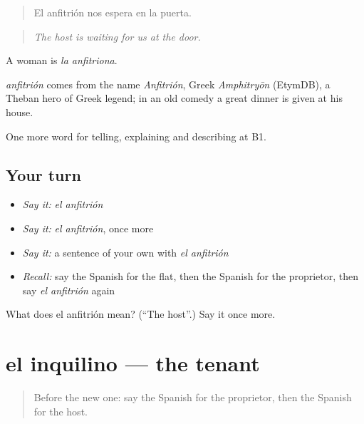 \begin{quote}
El anfitrión nos espera en la puerta.
\end{quote}

\begin{quote}
\emph{The host is waiting for us at the door.}
\end{quote}

A woman is \emph{la anfitriona}.

\begin{cousinweb}
\emph{anfitrión} comes from the name \emph{Anfitrión}, Greek \emph{Amphitryōn} (EtymDB), a Theban hero of Greek legend; in an old comedy a great dinner is given at his house.
\end{cousinweb}

\begin{grammarlens}[title={What you've built}]
One more word for telling, explaining and describing at B1.
\end{grammarlens}

\subsection*{Your turn}
\begin{itemize}
\raggedright
  \item \emph{Say it:} \emph{el anfitrión}
  \item \emph{Say it:} \emph{el anfitrión}, once more
  \item \emph{Say it:} a sentence of your own with \emph{el anfitrión}
  \item \emph{Recall:} say the Spanish for the flat, then the Spanish for the proprietor, then say \emph{el anfitrión} again
\end{itemize}

\begin{tcolorbox}[breakable,colback=teal!4,colframe=teal!35!black,title={Before you move on}]
What does el anfitrión mean? (\textquotedblleft{}The host\textquotedblright{}.) Say it once more.
\end{tcolorbox}
\section[el inquilino]{el inquilino — the tenant}

\label{lesson:ES-C667-inquilino}



\begin{quote}
Before the new one: say the Spanish for the proprietor, then the Spanish for the host.
\end{quote}


